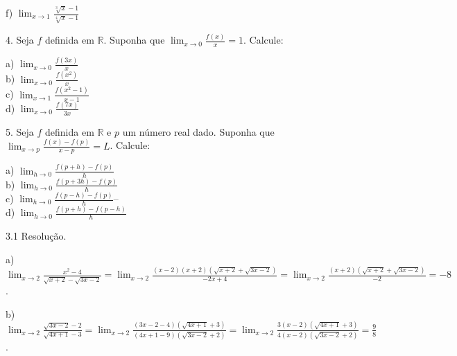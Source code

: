 \documentclass{article}
\begin{document}
{\begin{newpage}
\begin{multicols}{3}
    \\
f) $\displaystyle{\lim_{x\to 1} \frac{\sqrt[3]{x} - 1}{\sqrt[4]{x} - 1}}$
\end{multicols}
\par
\vspace{0.3cm}
\begin{flushleft}
4. Seja $f$ definida em $\mathbb{R}$. Suponha que $\displaystyle{\lim_{x\to 0} \frac{f(x)}{x} = 1}$. Calcule:
\end{flushleft}
\par
\begin{multicols}{4}
a) $\displaystyle{\lim_{x\to 0} \frac{f(3x)}{x}}$\\
b) $\displaystyle{\lim_{x\to 0} \frac{f(x^2)}{x}}$             \\
c) $\displaystyle{\lim_{x\to 1} \frac{f(x^2 - 1)}{x-1}}$       \\
d) $\displaystyle{\lim_{x\to 0} \frac{f(7x)}{3x}}$     
\end{multicols}
\par
\vspace{0.3cm}
\begin{flushleft}
5. Seja $f$ definida em $\mathbb{R}$ e $p$ um número real dado. Suponha que $\displaystyle{\lim_{x\to p} \frac{f(x) - f(p)}{x-p} = L}$. Calcule:
\end{flushleft}
\par
\begin{multicols}{4}
\hspace{-15pt}a) $\displaystyle{\lim_{h\to 0} \frac{f(p+h) - f(p)}{h}}$\\
b) $\displaystyle{\lim_{h\to 0} \frac{f(p+3h) - f(p)}{h}}$\\
c) $\displaystyle{\lim_{h\to 0} \frac{f(p-h) - f(p)}{h}}$--\\
d) $\displaystyle{\lim_{h\to 0} \frac{f(p+h) - f(p-h)}{h}}$
\end{multicols}
\par
\vspace{0.3cm}
\begin{flushleft}
3.1 Resolução.
\end{flushleft}
\par
a) $\displaystyle{\lim_{x\to 2} \frac{x^2 - 4}{\sqrt{x+2} - \sqrt{3x-2}} = \lim_{x\to 2} \frac{(x-2)(x+2)(\sqrt{x+2} + \sqrt{3x - 2})}{-2x + 4} = \lim_{x\to 2} \frac{(x+2)(\sqrt{x+2}+\sqrt{3x - 2})}{-2} = -8}$.
\par
\vspace{0.3cm}
b) $\displaystyle{\lim_{x\to 2} \frac{\sqrt{3x - 2} - 2}{\sqrt{4x + 1} - 3} = \lim_{x\to 2} \frac{(3x - 2 - 4)(\sqrt{4x + 1} + 3)}{(4x + 1 - 9)(\sqrt{3x - 2} + 2)} = \lim_{x\to 2} \frac{3(x-2)(\sqrt{4x + 1} + 3)}{4(x-2)(\sqrt{3x - 2} + 2)} = \frac{9}{8}}$.

\end{newpage}}
\end{document}
